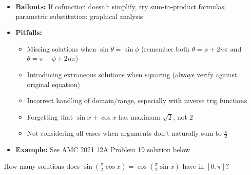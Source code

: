 \documentclass[12pt]{article}
\newenvironment{problem}[1]
{\begin{tcolorbox}[colback=blue!5!white,colframe=blue!75!black,title={#1}]}{\end{tcolorbox}}
\begin{document}
\begin{itemize}
\begin{itemize}
        \item For $a\sin x + b\cos x = c$: range is $[-\sqrt{a^2 + b^2}, \sqrt{a^2 + b^2}]$ when $a, b \neq 0$
        \item Always check if $|k| \leq \sqrt{2}$ for $\sin x \pm \cos x = k$ to determine if solutions exist
    \end{itemize}
    \item \textbf{Bailouts:} If cofunction doesn't simplify, try sum-to-product formulas; parametric substitution; graphical analysis
    \item \textbf{Pitfalls:} 
    \begin{itemize}
        \item Missing solutions when $\sin\theta = \sin\phi$ (remember both $\theta = \phi + 2n\pi$ and $\theta = \pi - \phi + 2n\pi$)
        \item Introducing extraneous solutions when squaring (always verify against original equation)
        \item Incorrect handling of domain/range, especially with inverse trig functions
        \item Forgetting that $\sin x + \cos x$ has maximum $\sqrt{2}$, not 2
        \item Not considering all cases when arguments don't naturally sum to $\frac{\pi}{2}$
    \end{itemize}
    \item \textbf{Example:} See AMC 2021 12A Problem 19 solution below
\end{itemize}

\begin{problem}{Example: Cofunction Solving}
How many solutions does $\sin\left(\frac{\pi}{2}\cos x\right) = \cos\left(\frac{\pi}{2}\sin x\right)$ have in $[0,\pi]$?
\end{problem}
\end{document}
